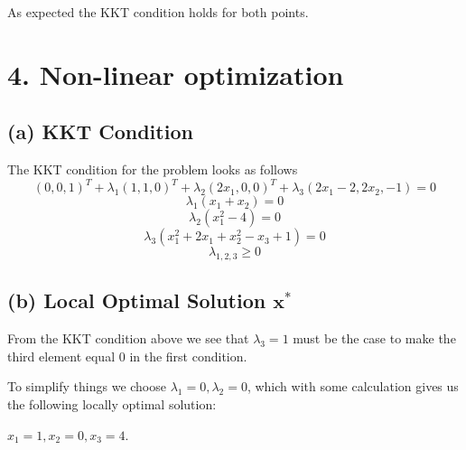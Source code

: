 \documentclass[12pt]{report}
\begin{document}
		As expected the KKT condition holds for both points.
		
\section*{4. Non-linear optimization}

	\subsection*{(a) KKT Condition}
		The KKT condition for the problem looks as follows
		$$ (0,0,1)^T + \lambda_1(1,1,0)^T + \lambda_2(2x_1,0,0)^T + \lambda_3(2x_1-2,2x_2,-1) = 0 $$
		$$\lambda_1 (x_1 + x_2) = 0 $$
		$$\lambda_2 (x_1^2 - 4) = 0 $$
		$$\lambda_3 (x_1^2 +2x_1 + x_2^2 - x_3 + 1) = 0 $$
		$$\lambda_{1,2,3} \ge 0 $$


	\subsection*{(b) Local Optimal Solution $\textbf{x}^*$}
		From the KKT condition above we see that $\lambda_3=1$ must be the case to make the third element equal $0$ in the first condition.

		To simplify things we choose $\lambda_1=0, \lambda_2=0$, which with some calculation gives us the following locally optimal solution: 

		$x_1=1,x_2=0,x_3=4$.
\end{document}
